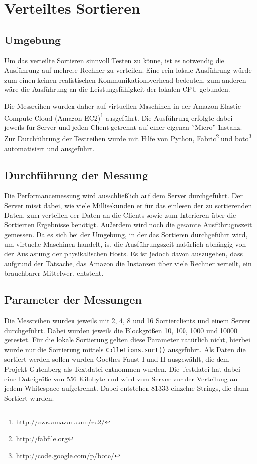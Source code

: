 \documentclass[fontsize=12pt,a4paper,headinclude=no,headings=small]{scrartcl}
\newcommand{\footurl}[1]{\footnote{\url{#1}}}
\begin{document}
\section{Verteiltes Sortieren}
\subsection{Umgebung}\label{sort:umgebung}
Um das verteilte Sortieren sinnvoll Testen zu könne, ist es notwendig die Ausführung auf mehrere Rechner zu verteilen. Eine rein lokale Ausführung würde zum einen keinen realistischen Kommunikationoverhead bedeuten, zum anderen wäre die Ausführung an die Leistungsfähigkeit der lokalen CPU gebunden.

Die Messreihen wurden daher auf virtuellen Maschinen in der Amazon Elastic Compute Cloud (Amazon EC2)\footurl{http://aws.amazon.com/ec2/} ausgeführt. Die Ausführung erfolgte dabei jeweils für Server und jeden Client getrennt auf einer eigenen "`Micro"' Instanz. Zur Durchführung der Testreihen wurde mit Hilfe von Python, Fabric\footurl{http://fabfile.org} und boto\footurl{http://code.google.com/p/boto/} automatisiert und ausgeführt.

\subsection{Durchführung der Messung}\label{sort:messung}
Die Performancemessung wird ausschließlich auf dem Server durchgeführt. Der Server misst dabei, wie viele Millisekunden er für das einlesen der zu sortierenden Daten, zum verteilen der Daten an die Clients sowie zum Interieren über die Sortierten Ergebnisse benötigt. Außerdem wird noch die gesamte Ausführugnszeit gemessen. Da es sich bei der Umgebung, in der das Sortieren durchgeführt wird, um virtuelle Maschinen handelt, ist die Ausführungszeit natürlich abhängig von der Auslastung der physikalischen Hosts. Es ist jedoch davon auszugehen, dass aufgrund der Tatsache, das Amazon die Instanzen über viele Rechner verteilt, ein brauchbarer Mittelwert entsteht.

\subsection{Parameter der Messungen}
Die Messreihen wurden jeweils mit 2, 4, 8 und 16 Sortierclients und einem Server durchgeführt. Dabei wurden jeweils die Blockgrößen 10, 100, 1000 und 10000 getestet. Für die lokale Sortierung gelten diese Parameter natürlich nicht, hierbei wurde nur die Sortierung mittels \texttt{Colletions.sort()} ausgeführt. Als Daten die sortiert werden sollen wurden Goethes Faust I und II ausgewählt, die dem Projekt Gutenberg als Textdatei entnommen wurden. Die Testdatei hat dabei eine Dateigröße von 556 Kilobyte und wird vom Server vor der Verteilung an jedem Whitespace aufgetrennt. Dabei entstehen 81333 einzelne Strings, die dann Sortiert wurden.
\end{document}
